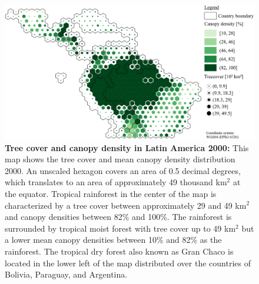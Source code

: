 			\begin{figure}[ht]
				\centering
				\includegraphics[scale=.85]{img/americas_treecover_frameless}
				\caption[Tree cover and canopy density in Latin America 2000]{\textbf{Tree cover and canopy density in Latin America 2000:} This map shows the tree cover and mean canopy density distribution 2000. An unscaled hexagon covers an area of 0.5 decimal degrees, which translates to an area of approximately 49 thousand km$^2$ at the equator. Tropical rainforest in the center of the map is characterized by a tree cover between approximately 29 and 49 km$^2$ and canopy densities between 82\% and 100\%. The rainforest is surrounded by tropical moist forest with tree cover up to 49 km$^2$ but a lower mean canopy densities between 10\% and 82\% as the rainforest. The tropical dry forest also known as Gran Chaco is located in the lower left of the map distributed over the countries of Bolivia, Paraguay, and Argentina.}
				\label{fig:americas_tree_cover}
			\end{figure}

